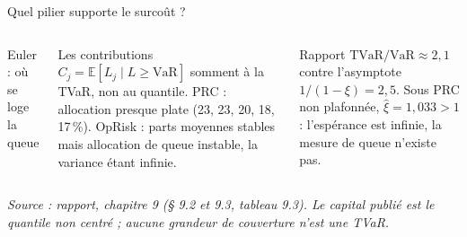 \documentclass[aspectratio=169,10pt,t]{beamer}
\newcommand{\source}[1]{\par\vfill{\tiny\color{gris}\textit{Source : #1}}\par\vspace{-1mm}}
\begin{document}
\begin{frame}{Quel pilier supporte le surcoût ?}
\begin{columns}[T,onlytextwidth]
    {\editorial\normalsize Euler : où se loge la queue}\par\vspace{1mm}
    Les contributions $C_j=\mathbb E[L_j\mid L\ge\mathrm{VaR}]$ somment à la TVaR, non au quantile. PRC : allocation presque plate (23, 23, 20, 18, 17\,\%). OpRisk : parts moyennes stables mais allocation de queue instable, la variance étant infinie.\par\vspace{1mm}
    Rapport $\mathrm{TVaR}/\mathrm{VaR}\approx2{,}1$ contre l'asymptote $1/(1-\xi)=2{,}5$. Sous PRC non plafonnée, $\hat\xi=1{,}033>1$ : l'espérance est infinie, la mesure de queue n'existe pas.
  \end{columns}
  \source{rapport, chapitre 9 (§ 9.2 et 9.3, tableau 9.3). Le capital publié est le quantile non centré ; aucune grandeur de couverture n'est une TVaR.}
\end{frame}
\end{document}
